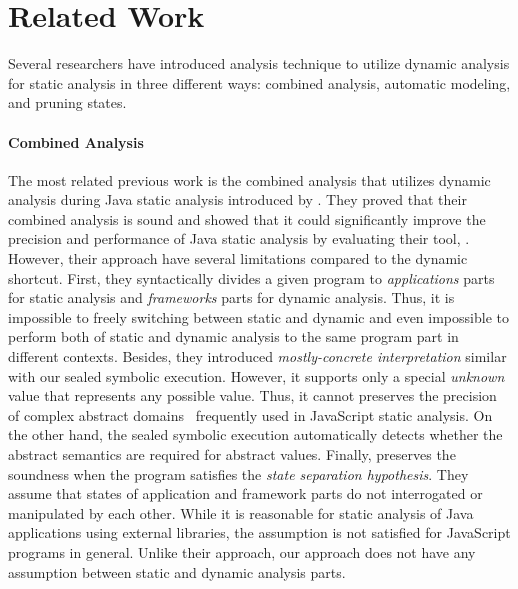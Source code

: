 \section{Related Work}\label{sec:related}

Several researchers have introduced analysis technique to utilize dynamic
analysis for static analysis in three different ways: combined analysis,
automatic modeling, and pruning states.


\paragraph{Combined Analysis}

The most related previous work is the combined analysis that utilizes dynamic
analysis during Java static analysis introduced by \citet{concerto}.  They
proved that their combined analysis is sound and showed that it could
significantly improve the precision and performance of Java static analysis by
evaluating their tool, \concerto.  However, their approach have several
limitations compared to the dynamic shortcut.  First, they syntactically divides
a given program to \textit{applications} parts for static analysis and
\textit{frameworks} parts for dynamic analysis.  Thus, it is impossible to
freely switching between static and dynamic and even impossible to perform both
of static and dynamic analysis to the same program part in different contexts.
Besides, they introduced \textit{mostly-concrete interpretation} similar with
our sealed symbolic execution.  However, it supports only a special
\textit{unknown} value that represents any possible value.  Thus, it cannot
preserves the precision of complex abstract domains~\cite{revisit-recency,
regex, weaklySPE} frequently used in JavaScript static analysis.  On the other
hand, the sealed symbolic execution automatically detects whether the abstract
semantics are required for abstract values.  Finally, \concerto preserves the
soundness when the program satisfies the \textit{state separation hypothesis}.
They assume that states of application and framework parts do not interrogated
or manipulated by each other.  While it is reasonable for static analysis of
Java applications using external libraries, the assumption is not satisfied for
JavaScript programs in general.  Unlike their approach, our approach does not
have any assumption between static and dynamic analysis parts.


